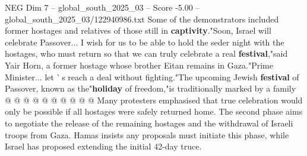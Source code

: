 \begin{textsample}{NEG Dim 7 – global\_south\_2025\_03 – Score -5.00 – global\_south\_2025\_03/122940986.txt}
Some of the demonstrators included former hostages and relatives of those still in \textbf{captivity}."Soon, Israel will celebrate Passover...
I wish for us to be able to hold the seder night with the hostages, who must return so that we can truly celebrate a real \textbf{festival},"said Yair Horn, a former hostage whose brother Eitan remains in Gaza."Prime Minister... let ' s reach a deal without fighting."The upcoming Jewish \textbf{festival} of Passover, known as the"\textbf{holiday} of freedom,"is traditionally marked by a family @ @ @ @ @ @ @ @ @ @ Many protesters emphasised that true celebration would only be possible if all hostages were safely returned home.
The second phase aims to negotiate the release of the remaining hostages and the withdrawal of Israeli troops from Gaza.
Hamas insists any proposals must initiate this phase, while Israel has proposed extending the initial 42-day truce.

\end{textsample}
